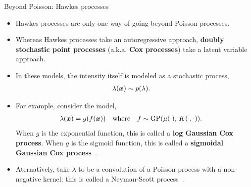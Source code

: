 \documentclass[aspectratio=169]{beamer}
\begin{document}
\begin{frame}[t]{Beyond Poisson: Hawkes processes }
    \begin{itemize}
        \itemsep.5em
        
        \item Hawkes processes are only one way of going beyond Poisson processes. 
        
        \item Whereas Hawkes processes take an autoregressive approach, \textbf{doubly stochastic point processes} (a.k.a. \textbf{Cox processes}) take a latent variable approach.
        
        \item In these models, the intensity itself is modeled as a stochastic process,
        \begin{align}
            \lambda(\boldsymbol{x}) &\sim p(\lambda).
        \end{align}
        
        \item For example, consider the model,
        \begin{align}
            \lambda(\boldsymbol{x}) &= g(f(\boldsymbol{x})) \quad \text{where} \quad
            f \sim \mathrm{GP}(\mu(\cdot), \, K(\cdot, \cdot)).
        \end{align}
        When $g$ is the exponential function, this is called a \textbf{log Gaussian Cox process}. When $g$ is the sigmoid function, this is called a \textbf{sigmoidal Gaussian Cox process}~\citep{adams2009tractable}.
        
        \item Aternatively, take $\lambda$ to be a convolution of a Poisson process with a non-negative kernel; this is called a Neyman-Scott process~\citep[e.g.]{wang2022spatiotemporal}.
    \end{itemize}
\end{frame}
\end{document}
